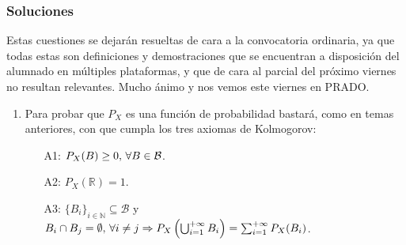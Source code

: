 \documentclass[fleqn]{article}
\def\R{\mathds{R}}
\def\N{\mathds{N}}
\begin{document}
\begin{enumerate}
                \newpage

                \subsubsection{Soluciones}
                                Estas cuestiones se dejarán resueltas de cara a la convocatoria ordinaria, ya que todas estas son definiciones y demostraciones
                        que se encuentran a disposición del alumnado en múltiples plataformas, y que de cara al parcial del próximo viernes no resultan 
                        relevantes. Mucho ánimo y nos vemos este viernes en PRADO.

                        \begin{enumerate}
                                \item Para probar que $P_X$ es una función de probabilidad bastará, como en temas anteriores, con que cumpla los tres axiomas
                                        de Kolmogorov:
                                        \begin{enumerate}
                                                \item[A1:]  $P_X(B) \geq 0, \thinspace \forall B \in \mathcal{B}$. 
                                                \item[A2:]  $ P_X(\R) = 1$.
                                                \item[A3:]  $ \{B_i\}_{i \in \N} \subseteq \mathcal{B}$ y $B_i \cap B_j = \emptyset, \thinspace \forall i \neq j 
                                                                \Rightarrow P_X \left( \bigcup_{i=1}^{+\infty} B_i\right) = \sum_{i=1}^{+\infty} P_X(B_i)$.
                                        \end{enumerate}
                        \end{enumerate}

        \end{enumerate}
\end{document}
